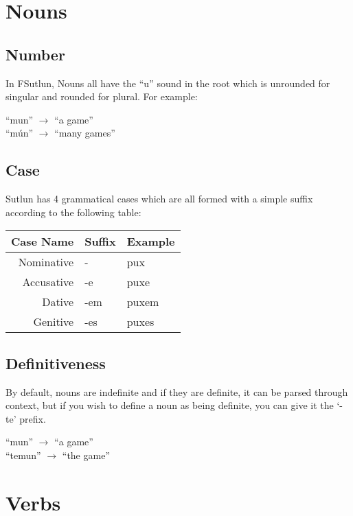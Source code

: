 \documentclass{book}
\begin{document}
\section{Nouns}
\subsection{Number}
In FSutlun, Nouns all have the ``u'' sound in the root which is unrounded for singular and rounded for plural.
For example:

\begin{center}
    ``mun'' $\rightarrow$ ``a game'' \\
    ``mún'' $\rightarrow$ ``many games''
\end{center}

\subsection{Case}
Sutlun has 4 grammatical cases which are all formed with a simple suffix according to the following table:

\begin{center}
    \begin{tabular}{|r|l|l|}
        \hline
        Case Name   & Suffix    & Example \\
        \hline
        Nominative  & -         & pux \\
        Accusative  & -e        & puxe \\
        Dative      & -em       & puxem \\
        Genitive    & -es       & puxes \\
        \hline
    \end{tabular}
\end{center}

\subsection{Definitiveness}
By default, nouns are indefinite and if they are definite, it can be parsed through context,
but if you wish to define a noun as being definite, you can give it the `-te' prefix.

\begin{center}
    ``mun'' $\rightarrow$ ``a game'' \\
    ``temun'' $\rightarrow$ ``the game''
\end{center}


\section{Verbs}
\end{document}
